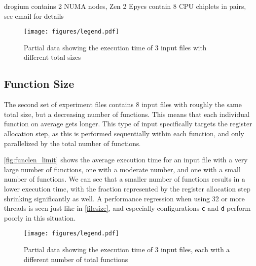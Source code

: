 \documentclass[11pt,dvipsnames]{article}
\newcommand{\helpme}[1]{{\color{red}#1}}
\newcommand{\mono}[1]{\texttt{#1}}
\begin{document}
\helpme{drogium contains 2 NUMA nodes, Zen 2 Epycs contain 8 CPU chiplets in pairs, see email for details}

\begin{figure}[!ht]
    \centering
    \texttt{[image: figures/legend.pdf]}
    \caption{Partial data showing the execution time of 3 input files with different total sizes}
    \label{fig:basic_limit}
\end{figure}

\subsection{Function Size}
The second set of experiment files contains 8 input files with roughly the same total size, but a decreasing number of functions. This means that each individual function on average gets longer. This type of input specifically targets the register allocation step, as this is performed sequentially within each function, and only parallelized by the total number of functions.

\autoref{fig:funclen_limit} shows the average execution time for an input file with a very large number of functions, one with a moderate number, and one with a small number of functions. We can see that a smaller number of functions results in a lower execution time, with the fraction represented by the register allocation step shrinking significantly as well. A performance regression when using 32 or more threads is seen just like in \autoref{filesize}, and especially configurations \mono{c} and \mono{d} perform poorly in this situation.

\begin{figure}[!ht]
    \centering
    \texttt{[image: figures/legend.pdf]}
    \caption{Partial data showing the execution time of 3 input files, each with a different number of total functions}
    \label{fig:funclen_limit}
\end{figure}
\end{document}
